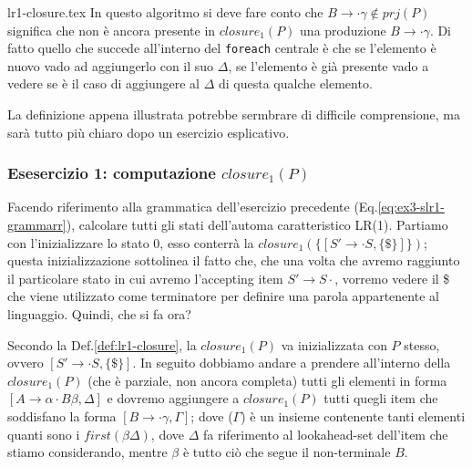 \documentclass[class=book, crop=false, oneside, 12pt]{standalone}
\begin{document}
{lr1-closure.tex}
In questo algoritmo si deve fare conto che \(B \to \cdot \gamma \notin prj(P)\) significa che non è ancora presente in \(closure_1(P)\) una produzione \(B \to \cdot \gamma\).
Di fatto quello che succede all'interno del \texttt{foreach} centrale è che se l'elemento è nuovo vado ad aggiungerlo con il suo \(\Delta\), se l'elemento è già presente vado a vedere se è il caso di aggiungere al \(\Delta\) di questa qualche elemento.

La definizione appena illustrata potrebbe sermbrare di difficile comprensione, ma sarà tutto più chiaro dopo un esercizio esplicativo.

\subsubsection{Esesercizio 1: computazione \(closure_1(P)\)}
Facendo riferimento alla grammatica dell'esercizio precedente (Eq.\ref{eq:ex3-slr1-grammarr}), calcolare tutti gli stati dell'automa caratteristico LR(1).
Partiamo con l'inizializzare lo stato \(0\), esso conterrà la \(closure_1(\{[S' \to \cdot S, \{\$\}]\})\); questa inizializzazione sottolinea il fatto che, che una volta che avremo raggiunto il particolare stato in cui avremo l'accepting item \(S' \to S\cdot \), vorremo vedere il \$ che viene utilizzato come terminatore per definire una parola appartenente al linguaggio. Quindi, che si fa ora?

Secondo la Def.\ref{def:lr1-closure}, la \(closure_1(P)\) va inizializzata con \(P\) stesso, ovvero \([S' \to \cdot S, \{\$\}]\).
In seguito dobbiamo andare a prendere all'interno della \(closure_1(P)\) (che è parziale, non ancora completa) tutti gli elementi in forma \([A \rightarrow \alpha \cdot B \beta, \Delta]\) e dovremo aggiungere a \(closure_1(P)\) tutti quegli item che soddisfano la forma \([B \rightarrow \cdot \gamma, \Gamma]\); dove (\(\Gamma\)) è un insieme contenente tanti elementi quanti sono i \(first(\beta \Delta)\), dove \(\Delta\) fa riferimento al lookahead-set dell'item che stiamo considerando, mentre \(\beta\) è tutto ciò che segue il non-terminale \(B\).
\end{document}
